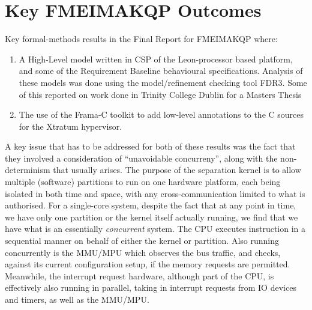 \section{Key FMEIMAKQP Outcomes}
Key formal-methods results in the Final Report for FMEIMAKQP\cite{FMEIMAKQP-R1}
where:
\begin{enumerate}
  \item
    A High-Level model written in CSP\cite{hoare-1985:commuseque:}
    of the Leon-processor based platform,
    and some of the Requirement Baseline\cite{IMAKQP-D02}
    behavioural specifications.
    Analysis of these models was done using
    the model/refinement checking tool FDR3\cite{FDR3}.
    Some of this reported on work done in Trinity College Dublin
    for a Masters Thesis\cite{KH-MCS2016}
  \item
    The use of the Frama-C toolkit\cite{Frama-C:user:Magnesium} to add low-level
    annotations to the C sources for the Xtratum hypervisor\cite{CRM10}.
\end{enumerate}
A key issue that has to be addressed for both of these results
was the fact that they involved a consideration of ``unavoidable concurreny'',
along with the non-determinism that usually arises.
The purpose of the separation kernel is to allow multiple
(software) partitions to run on one hardware platform,
each being isolated in both time and space,
with any cross-communication limited to what is authorised.
For a single-core system, despite the fact that at any point in time,
we have only one partition or the kernel itself actually running,
we find that we have what is an essentially \emph{concurrent} system.
The CPU executes instruction in a sequential manner on behalf
of either the kernel or partition.
Also running concurrently is the MMU/MPU which observes the bus traffic,
and checks, against its current configuration setup,
if the memory requests are permitted.
Meanwhile, the interrupt request hardware, although part of the CPU,
is effectively also running in parallel,
taking in interrupt requests from IO devices and timers,
as well as the MMU/MPU.


